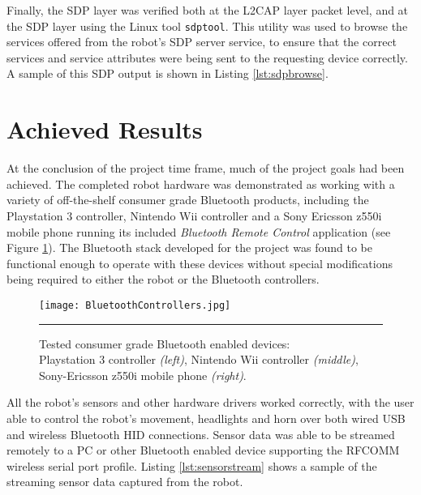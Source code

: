 

Finally, the SDP layer was verified both at the L2CAP layer packet level, and at the SDP layer using the Linux tool \texttt{sdptool}. This utility was used to browse the services offered from the robot's SDP server service, to ensure that the correct services and service attributes were being sent to the requesting device correctly. A sample of this SDP output is shown in Listing \ref{lst:sdpbrowse}.



\section{Achieved Results}

At the conclusion of the project time frame, much of the project goals had been achieved. The completed robot hardware was demonstrated as working with a variety of off-the-shelf consumer grade Bluetooth products, including the Playstation 3 controller, Nintendo Wii controller and a Sony Ericsson z550i mobile phone running its included \textit{Bluetooth Remote Control} application (see Figure \ref{fig:workingbtcontrollers}). The Bluetooth stack developed for the project was found to be functional enough to operate with these devices without special modifications being required to either the robot or the Bluetooth controllers.

\begin{figure}[tbph]
	\vspace{1em}
	\centering
		\texttt{[image: BluetoothControllers.jpg]}
	\rule{35em}{0.5pt}
	\caption[Tested Working Controllers]{Tested consumer grade Bluetooth enabled devices: \\ Playstation 3 controller \textit{(left)}, Nintendo Wii controller \textit{(middle)}, Sony-Ericsson z550i mobile phone \textit{(right)}.}
	\label{fig:workingbtcontrollers}
\end{figure}

All the robot's sensors and other hardware drivers worked correctly, with the user able to control the robot's movement, headlights and horn over both wired USB and wireless Bluetooth HID connections. Sensor data was able to be streamed remotely to a PC or other Bluetooth enabled device supporting the RFCOMM wireless serial port profile. Listing \ref{lst:sensorstream} shows a sample of the streaming sensor data captured from the robot.

